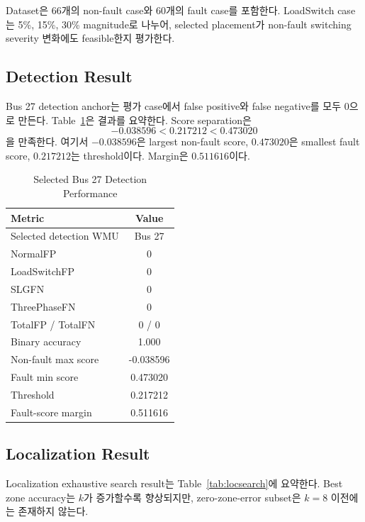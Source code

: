 \documentclass[conference]{IEEEtran}
\begin{document}
Dataset은 66개의 non-fault case와 60개의 fault case를 포함한다. LoadSwitch case는 5\%, 15\%, 30\% magnitude로 나누어, selected placement가 non-fault switching severity 변화에도 feasible한지 평가한다.

\subsection{Detection Result}

Bus 27 detection anchor는 평가 case에서 false positive와 false negative를 모두 0으로 만든다. Table~\ref{tab:bus27}은 결과를 요약한다. Score separation은
\begin{equation}
-0.038596 < 0.217212 < 0.473020
\end{equation}
을 만족한다. 여기서 $-0.038596$은 largest non-fault score, $0.473020$은 smallest fault score, $0.217212$는 threshold이다. Margin은 $0.511616$이다.

\begin{table}[t]
\caption{Selected Bus 27 Detection Performance}
\label{tab:bus27}
\centering
\begin{tabular}{lc}
\toprule
Metric & Value\\
\midrule
Selected detection WMU & Bus 27\\
NormalFP & 0\\
LoadSwitchFP & 0\\
SLGFN & 0\\
ThreePhaseFN & 0\\
TotalFP / TotalFN & 0 / 0\\
Binary accuracy & 1.000\\
Non-fault max score & -0.038596\\
Fault min score & 0.473020\\
Threshold & 0.217212\\
Fault-score margin & 0.511616\\
\bottomrule
\end{tabular}
\end{table}

\subsection{Localization Result}

Localization exhaustive search result는 Table~\ref{tab:locsearch}에 요약한다. Best zone accuracy는 $k$가 증가할수록 향상되지만, zero-zone-error subset은 $k=8$ 이전에는 존재하지 않는다.
\end{document}
